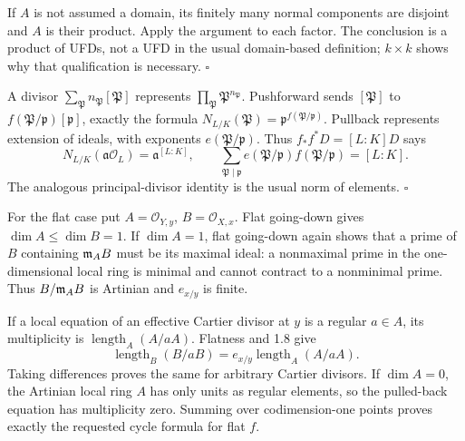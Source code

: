 \documentclass[11pt]{article}
\let\chapterexercise\exercise
\renewcommand{\exercise}[2]{\Needspace{8\baselineskip}\chapterexercise{#1}{#2}}
\begin{document}
If $A$ is not assumed a domain, its finitely many normal components are disjoint and $A$ is their product. Apply the argument to each factor. The conclusion is a product of UFDs, not a UFD in the usual domain-based definition; $k\times k$ shows why that qualification is necessary. \hfill$\square$

\pf
A divisor $\sum_{\mathfrak P}n_\mathfrak P[\mathfrak P]$ represents $\prod_\mathfrak P\mathfrak P^{n_\mathfrak P}$. Pushforward sends $[\mathfrak P]$ to $f(\mathfrak P/\mathfrak p)[\mathfrak p]$, exactly the formula $N_{L/K}(\mathfrak P)=\mathfrak p^{f(\mathfrak P/\mathfrak p)}$. Pullback represents extension of ideals, with exponents $e(\mathfrak P/\mathfrak p)$. Thus $f_*f^*D=[L:K]D$ says
\[ N_{L/K}(\mathfrak a\mathcal O_L)=\mathfrak a^{[L:K]},\qquad
\sum_{\mathfrak P\mid\mathfrak p}e(\mathfrak P/\mathfrak p)f(\mathfrak P/\mathfrak p)=[L:K]. \]
The analogous principal-divisor identity is the usual norm of elements. \hfill$\square$

\pf
For the flat case put $A=\mathcal O_{Y,y}$, $B=\mathcal O_{X,x}$. Flat going-down gives $\dim A\le\dim B=1$. If $\dim A=1$, flat going-down again shows that a prime of $B$ containing $\mathfrak m_AB$ must be its maximal ideal: a nonmaximal prime in the one-dimensional local ring is minimal and cannot contract to a nonminimal prime. Thus $B/\mathfrak m_AB$ is Artinian and $e_{x/y}$ is finite.

If a local equation of an effective Cartier divisor at $y$ is a regular $a\in A$, its multiplicity is $\operatorname{length}_A(A/aA)$. Flatness and 1.8 give
\[ \operatorname{length}_B(B/aB)=e_{x/y}\operatorname{length}_A(A/aA). \]
Taking differences proves the same for arbitrary Cartier divisors. If $\dim A=0$, the Artinian local ring $A$ has only units as regular elements, so the pulled-back equation has multiplicity zero. Summing over codimension-one points proves exactly the requested cycle formula for flat $f$.
\end{document}
